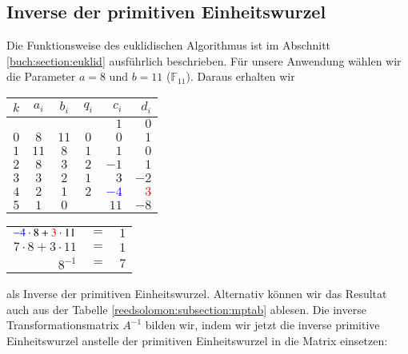 
\subsection{Inverse der primitiven Einheitswurzel
\label{reedsolomon:subsection:invEinh}}
%
Die Funktionsweise des euklidischen Algorithmus ist im Abschnitt \ref{buch:section:euklid} ausführlich beschrieben.
Für unsere Anwendung wählen wir die Parameter $a = 8$ und $b = 11$ ($\mathbb{F}_{11}$).
Daraus erhalten wir 

\begin{center}

\begin{tabular}{| c | c c | c | r r |}
	\hline
	$k$ & $a_i$ & $b_i$ & $q_i$ & $c_i$ & $d_i$\\
	\hline 
	& & & & $1$& $0$\\
	$0$& $8$& $11$& $0$& $0$& $1$\\
	$1$& $11$& $8$& $1$& $1$& $0$\\
	$2$& $8$& $3$& $2$& $-1$& $1$\\
	$3$& $3$& $2$& $1$& $3$& $-2$\\
	$4$& $2$& $1$& $2$& \textcolor{blue}{$-4$}& \textcolor{red}{$3$}\\
	$5$& $1$& $0$& & $11$& $-8$\\
	\hline
\end{tabular}

\end{center}
\begin{center}

\begin{tabular}{rcl}
	$\textcolor{blue}{-4} \cdot 8 + \textcolor{red}{3} \cdot 11$ &$=$& $1$\\
	$7 \cdot 8 + 3 \cdot 11$ &$=$& $1$\\
	$8^{-1}$ &$=$& $7$
	
\end{tabular}

\end{center}
als Inverse der primitiven Einheitswurzel.
Alternativ können wir das Resultat auch aus der Tabelle \ref{reedsolomon:subsection:mptab} ablesen.
Die inverse Transformationsmatrix $A^{-1}$ bilden wir, indem wir jetzt die inverse primitive Einheitswurzel anstelle der primitiven Einheitswurzel in die Matrix einsetzen:
